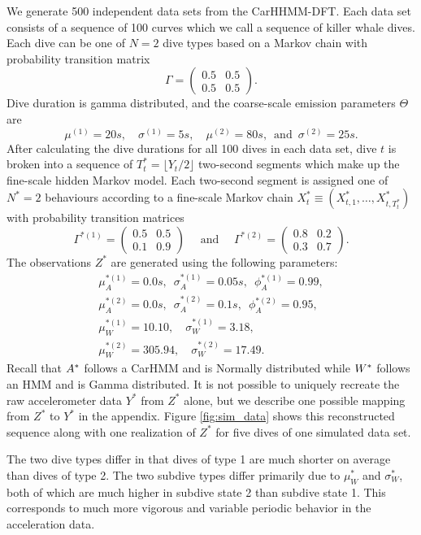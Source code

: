 We generate 500 independent data sets from the CarHHMM-DFT. Each data set consists of a sequence of 100 curves which we call a sequence of killer whale dives. Each dive can be one of $N=2$ dive types based on a Markov chain with probability transition matrix
%
$$\Gamma = \begin{pmatrix} 0.5 & 0.5 \\ 0.5 & 0.5 \end{pmatrix}.$$
%
Dive duration is gamma distributed, and the coarse-scale emission parameters $\Theta$ are
$$
    \mu^{(1)} = 20s, \quad \sigma^{(1)} = 5s, \quad
    \mu^{(2)} = 80s, \enspace \text{and} \enspace \sigma^{(2)} = 25s.
$$
%
After calculating the dive durations for all 100 dives in each data set, dive $t$ is broken into a sequence of $T^*_t = \lfloor Y_t/2 \rfloor$ two-second segments which make up the fine-scale hidden Markov model. Each two-second segment is assigned one of $N^*=2$ behaviours according to a fine-scale Markov chain $X^*_t \equiv \left(X^*_{t,1}, \ldots, X^*_{t,T^*_t} \right)$ with probability transition matrices
%
$$\Gamma^{*(1)} = \begin{pmatrix} 0.5 & 0.5 \\ 0.1 & 0.9 \end{pmatrix} \quad \text{ and } \quad \Gamma^{*(2)} = \begin{pmatrix} 0.8 & 0.2 \\ 0.3 & 0.7 \end{pmatrix}.$$ 
%
The observations $Z^*$ are generated using the following parameters:
%
\begin{gather*}
    \mu_A^{*(1)} = 0.0 s, \enspace \sigma_A^{*(1)} = 0.05s, \enspace \phi_A^{*(1)} = 0.99, \\
    \mu_A^{*(2)} = 0.0 s, \enspace \sigma_A^{*(2)} = 0.1s, \enspace \phi_A^{*(2)} = 0.95, \\
    \mu_W^{*(1)} = 10.10, \quad \sigma_W^{*(1)} = 3.18, \\
    \mu_W^{*(2)} = 305.94, \quad \sigma_W^{*(2)} = 17.49.
\end{gather*}
%
Recall that $A^*$ follows a CarHMM and is Normally distributed while $W^*$ follows an HMM and is Gamma distributed. It is not possible to uniquely recreate the raw accelerometer data $Y^*$ from $Z^*$ alone, but we describe one possible mapping from $Z^*$ to $Y^*$ in the appendix. Figure \ref{fig:sim_data} shows this reconstructed sequence along with one realization of $Z^*$ for five dives of one simulated data set. 

The two dive types differ in that dives of type 1 are much shorter on average than dives of type 2. The two subdive types differ primarily due to $\mu_W^*$ and $\sigma_W^*$, both of which are much higher in subdive state 2 than subdive state 1. This corresponds to much more vigorous and variable periodic behavior in the acceleration data.

